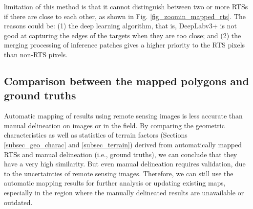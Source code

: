 \documentclass[authoryear,preprint,review,12pt]{elsarticle}
\begin{document}
 limitation of this method is that it cannot distinguish between two or more RTSs if there are close to each other, as shown in Fig. \ref{fig_zoomin_mapped_rts}. %
The reasons could be: (1) the deep learning algorithm, that is, DeepLabv3+ is not good at capturing the edges of the targets when they are too close; and (2) the merging processing of inference patches gives a higher priority to the RTS pixels than non-RTS pixels.

\subsection{Comparison between the mapped polygons and ground truths}
\label{subsec_potential_largeArea}



Automatic mapping of results using remote sensing images is less accurate than manual delineation on images or in the field. 
By comparing the geometric characteristics as well as statistics of terrain factors (Sections \ref{subsec_geo_charac} and \ref{subsec_terrain}) derived from automatically mapped RTSs and manual delineation (i.e., ground truths), we can conclude that they have a very high similarity. 
But even manual delineation requires validation, due to the uncertainties of remote sensing images.  
Therefore, we can still use the automatic mapping results for further analysis or updating existing maps, especially in the region where the manually delineated results are unavailable or outdated. 
\end{document}
